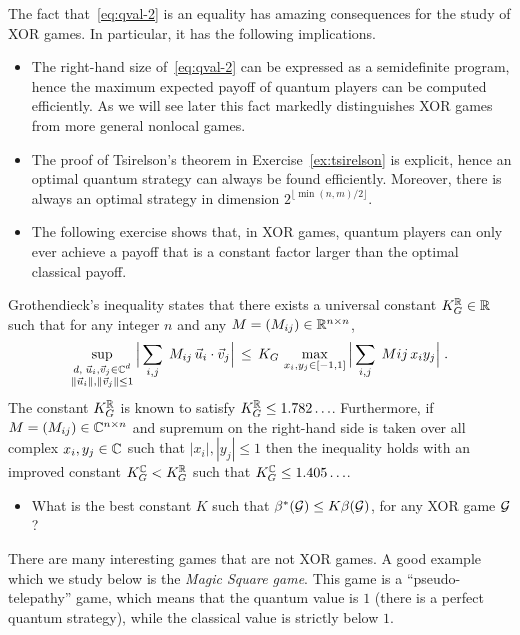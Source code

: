 The fact that~\eqref{eq:qval-2} is an equality has amazing consequences for the study of XOR games. In particular, it has the following implications. 
\begin{itemize}
  \item The right-hand size of~\eqref{eq:qval-2} can be expressed as a semidefinite program, hence the maximum expected payoff of quantum players can be computed efficiently. As we will see later this fact markedly distinguishes XOR games from more general nonlocal games. 
  \item The proof of Tsirelson's theorem in Exercise~\ref{ex:tsirelson} is explicit, hence an optimal quantum strategy can always be found efficiently. Moreover, there is always an optimal strategy in dimension $2^{\lfloor \min(n,m)/2 \rfloor}$. 
  \item The following exercise shows that, in XOR games, quantum players can only ever achieve a payoff that is a constant factor larger than the optimal classical payoff.
\end{itemize}

\begin{exercise}
Grothendieck's inequality states that there exists a universal constant $K_G^{\mathbb{R}}\in\mathbb{R}$ such that for any integer $n$ and any $M=(M_{ij})\in \mathbb{R}^{n\times n}$, 
\[\sup_{\substack{d,\;\vec{u}_i,\vec{v}_j\in \mathbb{C}^{d}\\ \|\vec{u}_i\|,\|\vec{v}_j\|\leq 1}} \Big|\sum_{i,j} \; M_{ij}\, \vec{u}_i\cdot \vec{v}_j \Big|\,\leq\, K_G\, \max_{x_i,y_j\in [-1,1]} \Big|\sum_{i,j} \; M{ij}\, x_i y_j \Big|\;.\]
The constant $K_G^{\mathbb{R}}$ is known to satisfy $K_G^{\mathbb{R}} \leq 1.782\ldots$.
Furthermore, if $M=(M_{ij})\in \mathbb{C}^{n\times n}$ and supremum on the right-hand side is taken over all complex $x_i,y_j\in \mathbb{C}$ such that $|x_i|,|y_j|\leq 1$ then the inequality holds with an improved constant $K_G^{\mathbb{C}} < K_G^{\mathbb{R}}$ such that $K_G^{\mathbb{C}} \leq 1.405\ldots$.
\begin{itemize}
\item What is the best constant $K$ such that $\beta^*(\mathcal{G}) \leq K \beta(\mathcal{G})$, for any XOR game $\mathcal{G}$?
\end{itemize}
\end{exercise}


\begin{remark}
There are many interesting games that are not XOR games. A good example which we study below is the \emph{Magic Square game}. This game is a ``pseudo-telepathy'' game, which means that the quantum value is $1$ (there is a perfect quantum strategy), while the classical value is strictly below $1$. 
\end{remark}


